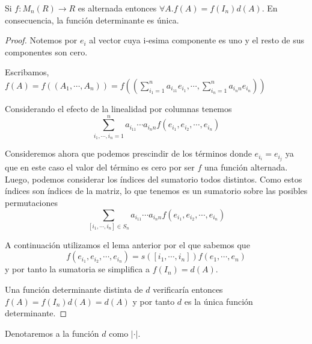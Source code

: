 \begin{proposition}
Si $f: M_n(R) \rightarrow R$ es alternada entonces $\forall A. f(A) = f(I_n)d(A)$. En consecuencia, la función determinante es única.
\end{proposition}
\begin{proof}
Notemos por $e_i$ al vector cuya i-esima componente es uno y el resto de sus componentes son cero. 

Escribamos, $f(A) = f((A_1,\cdots,A_n)) = f((\sum_{i_1 = 1}^{n} a_{i_11}e_{i_1},\cdots,\sum_{i_n = 1}^{n} a_{i_nn}e_{i_n}))$

Considerando el efecto de la linealidad por columnas tenemos $$\sum_{i_1,\cdots,i_n = 1}^n a_{i_11}\cdots a_{i_nn} f(e_{i_1},e_{i_2},\cdots,e_{i_n})$$

Consideremos ahora que podemos prescindir de los términos donde $e_{i_i} = e_{i_j}$ ya que en este caso el valor del término es cero por ser $f$ una función alternada. Luego, podemos considerar los índices del sumatorio todos distintos. Como estos índices son índices de la matriz, lo que tenemos es un sumatorio sobre las posibles permutaciones $$\sum_{[i_1,\cdots,i_n] \in S_n} a_{i_11}\cdots a_{i_nn} f(e_{i_1},e_{i_2},\cdots,e_{i_n})$$

A continuación utilizamos el lema anterior por el que sabemos que $$f(e_{i_1},e_{i_2},\cdots, e_{i_n}) = s([i_1,\cdots,i_n])f(e_1,\cdots,e_n)$$ y por tanto la sumatoria se simplifica a $f(I_n) = d(A)$.

Una función determinante distinta de $d$ verificaría entonces $f(A) = f(I_n) d(A) = d(A)$ y por tanto $d$ es la única función determinante. 
\end{proof}

Denotaremos a la función $d$ como $|\cdot|$.

